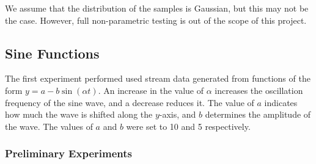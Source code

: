 \documentclass[a4paper,11pt,twoside]{article}
\begin{document}
  We assume that the distribution of the samples is Gaussian, but this may not be
  the case. However, full non-parametric testing is out of the scope of this project.
\subsection{Sine Functions}
\label{sec-8-1}

   The first experiment performed used stream data generated from functions of
   the form $y=a-b\sin(\alpha t)$. An increase in the value of $\alpha$
   increases the oscillation frequency of the sine wave, and a decrease reduces
   it. The value of $a$ indicates how much the wave is shifted along the
   $y$-axis, and $b$ determines the amplitude of the wave. The values of $a$ and
   $b$ were set to 10 and 5 respectively.
\subsubsection{Preliminary Experiments}
\label{sec-8-1-1}
\end{document}
